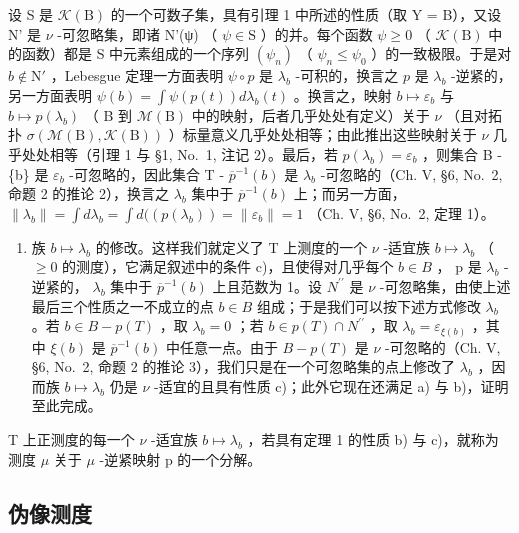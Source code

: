 设 S 是 \(\mathcal{K}(\mathrm{B})\) 的一个可数子集，具有引理 1 中所述的性质（取 Y = B），又设 N' 是 \(\nu\) -可忽略集，即诸 N'(ψ) （ \(\psi \in \mathrm{S}\) ）的并。每个函数 \(\psi \geqslant 0\) （ \(\mathcal{K}(\mathrm{B})\) 中的函数）都是 S 中元素组成的一个序列 \((\psi_n)\) （ \(\psi_n \leqslant \psi_0\) ）的一致极限。于是对 \(b \notin \mathrm{N}'\) ，Lebesgue 定理一方面表明 \(\psi \circ p\) 是 \(\lambda_b\) -可积的，换言之 \(p\) 是 \(\lambda_b\) -逆紧的，另一方面表明 \(\psi(b) = \int \psi(p(t)) d\lambda_b(t)\) 。换言之，映射 \(b \mapsto \varepsilon_b\) 与 \(b \mapsto p(\lambda_b)\) （ B 到 \(\mathcal{M}(\mathrm{B})\) 中的映射，后者几乎处处有定义）关于 \(\nu\) （且对拓扑 \(\sigma(\mathcal{M}(\mathrm{B}), \mathcal{K}(\mathrm{B}))\) ）标量意义几乎处处相等；由此推出这些映射关于 \(\nu\) 几乎处处相等（引理 1 与 §1, No.~1, 注记 2）。最后，若 \(p(\lambda_b) = \varepsilon_b\) ，则集合 B - \{b\} 是 \(\varepsilon_b\) -可忽略的，因此集合 T - \(\overline{p}^{-1}(b)\) 是 \(\lambda_b\) -可忽略的（Ch. V, §6, No.~2, 命题 2 的推论 2），换言之 \(\lambda_b\) 集中于 \(\overline{p}^{-1} (b)\) 上；而另一方面， \(\| \lambda_b\| = \int d\lambda_b = \int d((p(\lambda_b)) = \| \varepsilon_b\| = 1\) （Ch. V, §6, No.~2, 定理 1）。

\begin{enumerate}
\def\labelenumi{\arabic{enumi})}
\setcounter{enumi}{4}
\tightlist
\item
  族 \(b \mapsto \lambda_{b}\) 的修改。这样我们就定义了 T 上测度的一个 \(\nu\) -适宜族 \(b \mapsto \lambda_{b}\) （ \(\geqslant 0\) 的测度），它满足叙述中的条件 c)，且使得对几乎每个 \(b \in B\) ， p 是 \(\lambda_{b}\) -逆紧的， \(\lambda_{b}\) 集中于 \(\overline{p}^{-1}(b)\) 上且范数为 1。设 \(N^{\prime\prime}\) 是 \(\nu\) -可忽略集，由使上述最后三个性质之一不成立的点 \(b \in B\) 组成；于是我们可以按下述方式修改 \(\lambda_{b}\) 。若 \(b \in B - p(T)\) ，取 \(\lambda_{b} = 0\) ；若 \(b \in p(T) \cap N^{\prime\prime}\) ，取 \(\lambda_{b} = \varepsilon_{\xi(b)}\) ，其中 \(\xi(b)\) 是 \(\overline{p}^{-1}(b)\) 中任意一点。由于 \(B - p(T)\) 是 \(\nu\) -可忽略的（Ch. V, §6, No.~2, 命题 2 的推论 3），我们只是在一个可忽略集的点上修改了 \(\lambda_{b}\) ，因而族 \(b \mapsto \lambda_{b}\) 仍是 \(\nu\) -适宜的且具有性质 c)；此外它现在还满足 a) 与 b)，证明至此完成。
\end{enumerate}

T 上正测度的每一个 \(\nu\) -适宜族 \(b \mapsto \lambda_{b}\) ，若具有定理 1 的性质 b) 与 c)，就称为测度 \(\mu\) 关于 \(\mu\) -逆紧映射 p 的一个分解。

\subsection{伪像测度}


